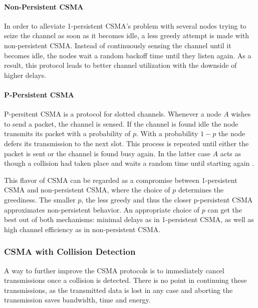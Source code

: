 \paragraph{Non-Persistent CSMA}

In order to alleviate 1-persistent CSMA's problem with several nodes trying to seize the channel as soon as it becomes idle, a less greedy attempt is made with non-persistent CSMA. Instead of continuously sensing the channel until it becomes idle, the nodes wait a random backoff time until they listen again. As a result, this protocol leads to better channel utilization with the downside of higher delays.

\paragraph{P-Persistent CSMA}

P-persitent CSMA is a protocol for slotted channels. Whenever a node $A$ wishes to send a packet, the channel is sensed. If the channel is found idle the node transmits its packet with a probability of $p$. With a probability $1-p$ the node defers its transmission to the next slot. This process is repeated until either the packet is sent or the channel is found busy again. In the latter case $A$ acts as though a collision had taken place and waits a random time until starting again \cite{Tanenbaum02}.

This flavor of CSMA can be regarded as a compromise between 1-persistent CSMA and non-persistent CSMA, where the choice of $p$ determines the greediness. The smaller $p$, the less greedy and thus the closer p-persistent CSMA approximates non-persistent behavior. An appropriate choice of $p$ can get the best out of both mechanisms: minimal delays as in 1-persistent CSMA, as well as high channel efficiency as in non-persistent CSMA.

\subsubsection{CSMA with Collision Detection}

A way to further improve the CSMA protocols is to immediately cancel transmissions once a collision is detected. There is no point in continuing these transmissions, as the transmitted data is lost in any case and aborting the transmission saves bandwidth, time and energy. 

